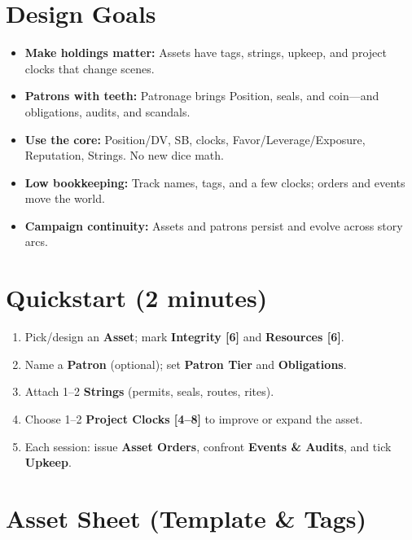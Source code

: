   \section*{Design Goals}
  \begin{itemize}
    \item \textbf{Make holdings matter:} Assets have tags, strings, upkeep, and project clocks that change scenes.
    \item \textbf{Patrons with teeth:} Patronage brings Position, seals, and coin---and obligations, audits, and scandals.
    \item \textbf{Use the core:} Position/DV, SB, clocks, Favor/Leverage/Exposure, Reputation, Strings. No new dice math.
    \item \textbf{Low bookkeeping:} Track names, tags, and a few clocks; orders and events move the world.
    \item \textbf{Campaign continuity:} Assets and patrons persist and evolve across story arcs.
  \end{itemize}
  
  \section*{Quickstart (2 minutes)}
  \begin{enumerate}
    \item Pick/design an \textbf{Asset}; mark \textbf{Integrity [6]} and \textbf{Resources [6]}.
    \item Name a \textbf{Patron} (optional); set \textbf{Patron Tier} and \textbf{Obligations}.
    \item Attach 1--2 \textbf{Strings} (permits, seals, routes, rites).
    \item Choose 1--2 \textbf{Project Clocks [4--8]} to improve or expand the asset.
    \item Each session: issue \textbf{Asset Orders}, confront \textbf{Events \& Audits}, and tick \textbf{Upkeep}.
  \end{enumerate}
  
  \tableofcontents
  \newpage
  
  \section{Asset Sheet (Template \& Tags)}
